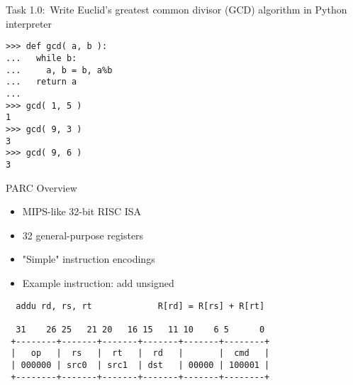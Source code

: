 
\section[{\it Hands-On} GCD Instr]{}


\begin{frame}[fragile]{\textcolor{cbxredC}{ Task 1.0:~Write
Euclid's greatest common divisor (GCD) algorithm in Python
interpreter~}}

\vspace{-20pt}

\begin{lstlisting}[numbers=none,basicstyle=\ttfamily]
% python
>>> def gcd( a, b ):
...   while b:
...     a, b = b, a%b
...   return a
...
>>> gcd( 1, 5 )
1
>>> gcd( 9, 3 )
3
>>> gcd( 9, 6 )
3
\end{lstlisting}

\end{frame}


\begin{frame}[fragile]{PARC Overview}

\begin{itemize}
  \item MIPS-like 32-bit RISC ISA
  \item 32 general-purpose registers
  \item "Simple" instruction encodings
  \item Example instruction: add unsigned
\end{itemize}

\begin{verbatim}
  addu rd, rs, rt             R[rd] = R[rs] + R[rt]

  31    26 25   21 20   16 15   11 10    6 5      0
 +--------+-------+-------+-------+-------+--------+
 |   op   |  rs   |  rt   |  rd   |       |  cmd   |
 | 000000 | src0  | src1  | dst   | 00000 | 100001 |
 +--------+-------+-------+-------+-------+--------+

\end{verbatim}

\end{frame}

